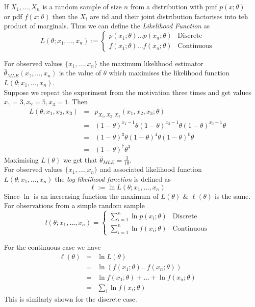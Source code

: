 \documentclass[11pt,a4paper]{article}
\begin{document}
\proposition{}
If $X_1,\dots,X_n$ is a random sample of size $n$ from a distribution with pmf $p(x;\theta)$ or pdf $f(x;\theta)$ then the $X_i$ are iid and their joint distribution factorises into teh product of marginals. Thus we can define the \textit{Likelihood Function} as
$$L(\theta;x_1,\dots,x_n):=\begin{cases}p(x_1;\theta)\dots p(x_n;\theta)& \mathrm{Discrete}\\f(x_1;\theta)\dots f(x_n;\theta)& \mathrm{Continuous}\end{cases}$$

For observed values $\{x_1,\dots,x_n\}$ the maximum likelihood estimator $\hat{\theta}_{MLE}(x_1,\dots,x_n)$ is the value of $\theta$ which maximises the likelihood function $L(\theta;x_1,\dots,x_n)$.\\

Suppose we repeat the experiment from the motivation three times and get values $x_1=3,x_2=5,x_3=1$. Then
\[\begin{array}{rcl}
L(\theta;x_1,x_2,x_3)&=&p_{X_1,X_2,X_3}(x_1,x_2,x_3;\theta)\\
&=&(1-\theta)^{x_1-1}\theta(1-\theta)^{x_2-1}\theta(1-\theta)^{x_3-1}\theta\\
&=&(1-\theta)^3\theta(1-\theta)^4\theta(1-\theta)^0\theta\\
&=&(1-\theta)^7\theta^3
\end{array}\]
Maximising $L(\theta)$ we get that $\hat{\theta}_{MLE}=\frac{3}{10}$.\\

For observed values $\{x_1,\dots,x_n\}$ and associated likelihood function $L(\theta;x_1,\dots,x_n)$ the \textit{log-likelihood function} is defined as
$$\ell:=\ln L(\theta;x_1,\dots,x_n)$$
\nb Since $\ln$ is an increasing function the maximum of $L(\theta)$ \& $\ell(\theta)$ is the same.\\

For observations from a simple random sample
$$l(\theta;x_1,\dots,x_n)=\begin{cases}\sum\limits_{i=1}^n\ln p(x_i;\theta)& \mathrm{Discrete}\\\sum\limits_{i=1}^n\ln f(x_i;\theta)& \mathrm{Continuous}\end{cases}$$

For the continuous case we have
\[\begin{array}{rcl}
\ell(\theta)&=&\ln L(\theta)\\
&=&\ln (f(x_1;\theta)\dots f(x_n;\theta))\\
&=&\ln f(x_1;\theta)+\dots+\ln f(x_n;\theta)\\
&=&\sum_i\ln f(x_i;\theta)
\end{array}\]
This is similarly shown for the discrete case.\\
\end{document}
